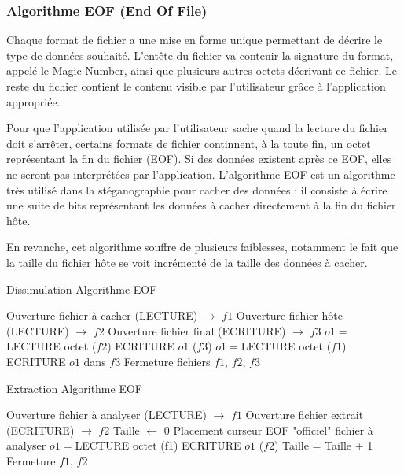 \documentclass[11pt]{article}
\begin{document}
\subsubsection{Algorithme EOF (End Of File)}

Chaque format de fichier a une mise en forme unique permettant de décrire le
type de données souhaité. L'entête du fichier va contenir la signature du
format, appelé le Magic Number, ainsi que plusieurs autres octets décrivant ce
fichier. Le reste du fichier contient le contenu visible par l'utilisateur grâce
à l'application appropriée. 

Pour que l'application utilisée par l'utilisateur sache quand la lecture du
fichier doit s'arrêter, certains formats de fichier continnent, à la toute fin,
un octet représentant la fin du fichier (EOF). Si des données existent après ce
EOF, elles ne seront pas interprétées par l'application. L'algorithme EOF est un
algorithme très utilisé dans la stéganographie pour cacher des données : il
consiste à écrire une suite de bits représentant les données à cacher
directement à la fin du fichier hôte.

En revanche, cet algorithme souffre de plusieurs faiblesses, notamment 
le fait que la taille du fichier hôte se voit incrémenté de la taille 
des données à cacher.

\begin{minipage}{.5\textwidth}
\begin{algorithm}[H]
\caption{Dissimulation Algorithme EOF}
\begin{algorithmic}
\STATE \footnotesize Ouverture fichier à cacher (LECTURE) $\rightarrow$ $f1$
\STATE Ouverture fichier hôte (LECTURE) $\rightarrow$ $f2$
\STATE Ouverture fichier final (ECRITURE) $\rightarrow$ $f3$
\STATE $o1 = $LECTURE octet ($f2$)
\STATE ECRITURE $o1$ ($f3$)
\ENDWHILE
{}
\STATE $o1 =$LECTURE octet ($f1$)
\STATE ECRITURE $o1$ dans $f3$
\ENDWHILE
\STATE Fermeture fichiers $f1$, $f2$, $f3$
\end{algorithmic}
\end{algorithm}
\normalsize
\end{minipage}
\begin{minipage}{.5\textwidth}
\begin{algorithm}[H]
\caption{Extraction Algorithme EOF}
\begin{algorithmic}
\STATE \footnotesize Ouverture fichier à analyser (LECTURE) $\rightarrow$ $f1$
\STATE Ouverture fichier extrait (ECRITURE) $\rightarrow$ $f2$
\STATE Taille $\leftarrow$ 0
\STATE Placement curseur EOF "officiel" fichier à analyser
\STATE $o1 = $LECTURE octet (f1)
\STATE ECRITURE $o1$ ($f2$)
\STATE Taille = Taille + 1
\ENDWHILE
\STATE Fermeture $f1$, $f2$
\end{algorithmic}
\end{algorithm}
\normalsize
\end{minipage}
\end{document}
